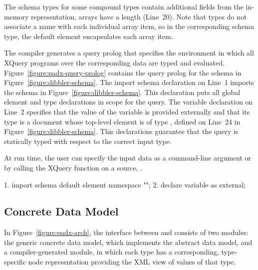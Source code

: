 The schema types for some compound types contain additional fields
from the \pads{} in-memory representation, \eg{} arrays have a length
(Line~20).  Note that  types do not associate a name with
each individual array item, so in the corresponding schema type, the
default element  encapsulates each array item.

The \pads{} compiler generates a query prolog that specifies the
environment in which all XQuery programs over the corresponding data
are typed and evaluated. 
Figure~\ref{figure:padx-query-prolog} contains the query prolog for
the schema in Figure~\ref{figure:dibbler-schema}.  The import schema
declaration on Line~1 imports the schema in
Figure~\ref{figure:dibbler-schema}.  This declaration puts all global
element and type declarations in scope for the query.  The variable
declaration on Line~2 specifies that the value of the variable
 is provided externally and that its type is a document
whose top-level element is of type , defined on Line~24 in
Figure~\ref{figure:dibbler-schema}.  This declarations guarantee
that the query is statically typed with respect to the correct input type.

At run time, the user can specify
the input data as a command-line argument or by calling the XQuery
 function on a \pads{} source, \eg{} .
\begin{figure*}
\begin{small}
\begin{code}
 1. import schema default element namespace "";
 2. declare variable  as  external; 
\end{code}
\end{small}
\caption{\padx{} generated query prolog}
\label{figure:padx-query-prolog}
\end{figure*}

\subsection{\padx{} Concrete Data Model}

In Figure~\ref{figure:padx-arch}, the interface between \Galax{} and
\pads{} consists of two modules: the generic \padx{} concrete data model,
which implements the \Galax{} abstract data model, and a
compiler-generated module, in which each \pads{} type has a
corresponding, type-specific node representation providing the XML
view of values of that type.

